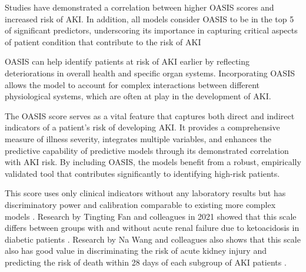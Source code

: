 \documentclass[sn-mathphys-num]{sn-jnl}%
\theoremstyle{thmstyleone}%
\theoremstyle{thmstyletwo}%
\theoremstyle{thmstylethree}%
\begin{document}
Studies \cite{shi2024clinical}\cite{hang2024blood} have demonstrated a correlation between higher OASIS scores and increased risk of AKI. In addition, all models consider OASIS to be in the top 5 of significant predictors, underscoring its importance in capturing critical aspects of patient condition that contribute to the risk of AKI

OASIS can help identify patients at risk of AKI earlier by reflecting deteriorations in overall health and specific organ systems. Incorporating OASIS allows the model to account for complex interactions between different physiological systems, which are often at play in the development of AKI.

The OASIS score serves as a vital feature that captures both direct and indirect indicators of a patient’s risk of developing AKI. It provides a comprehensive measure of illness severity, integrates multiple variables, and enhances the predictive capability of predictive models through its demonstrated correlation with AKI risk. By including OASIS, the models benefit from a robust, empirically validated tool that contributes significantly to identifying high-risk patients.


This score uses only clinical indicators without any laboratory results but has discriminatory power and calibration comparable to existing more complex models \cite{chen2019prognosis}. Research by Tingting Fan and colleagues in 2021 showed that this scale differs between groups with and without acute renal failure due to ketoacidosis in diabetic patients \cite{monogram-aki-dka}. Research by Na Wang and colleagues also shows that this scale also has good value in discriminating the risk of acute kidney injury and predicting the risk of death within 28 days of each subgroup of AKI patients \cite{ wang2022predictive}.
\end{document}
